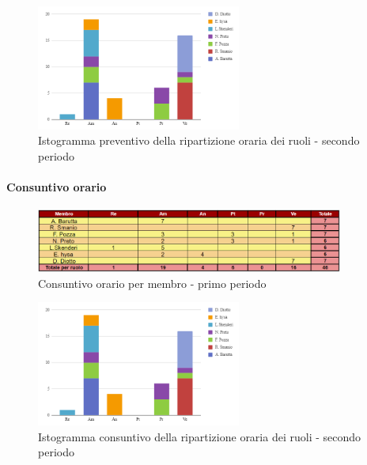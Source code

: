 \begin{figure}[H]
    \centering
    \includegraphics[width=0.6\textwidth]{../Images/preventivoDivisioneRuoli2Periodo.png}
    \caption{Istogramma preventivo della ripartizione oraria dei ruoli - secondo periodo}
    \label{fig:PvD1}
\end{figure}

\paragraph{Consuntivo orario } \hspace{1pt}

\begin{figure}[ht]
    \centering
    \includegraphics[width=0.9\textwidth]{../Images/consuntivoOrario2Periodo.png}
    \caption{Consuntivo orario per membro - primo periodo}
    \label{fig:Cv1}
\end{figure}

\begin{figure}[H]
    \centering
    \includegraphics[width=0.6\textwidth]{../Images/consuntivoDivisioneRuoli2Periodo.png}
    \caption{Istogramma consuntivo della ripartizione oraria dei ruoli - secondo periodo}
    \label{fig:CD1}
\end{figure}
